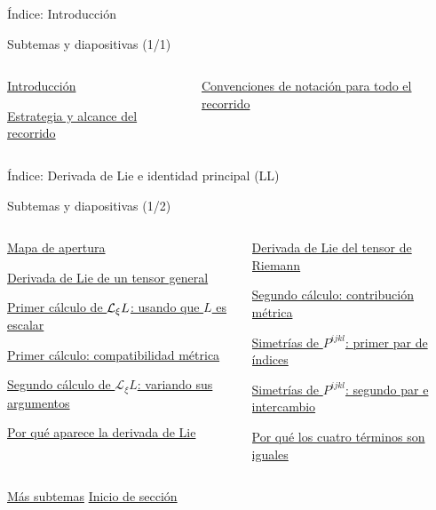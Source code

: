 \newcommand{\IndexEntry}[2]{%
\noindent\parbox[t]{.89\linewidth}{\raggedright\hyperlink{#1}{#2}}%
\hfill\parbox[t]{.08\linewidth}{\raggedleft\scriptsize\hyperlink{#1}{\pageref{#1}}}%
\par\medskip}

\begin{frame}[label=nav-index-0-1]{Índice: Introducción}
\footnotesize\raggedright
\textcolor{structure.fg}{Subtemas y diapositivas (1/1)}\par\medskip
\begin{columns}[T,onlytextwidth]
\begin{column}{.48\textwidth}
\IndexEntry{nav-frame-001}{Introducción}
\IndexEntry{nav-frame-002}{Estrategia y alcance del recorrido}
\end{column}
\begin{column}{.48\textwidth}
\IndexEntry{nav-notation}{Convenciones de notación para todo el recorrido}
\end{column}
\end{columns}
\vfill
\end{frame}

\begin{frame}[label=nav-index-1-1]{Índice: Derivada de Lie e identidad principal (LL)}
\footnotesize\raggedright
\textcolor{structure.fg}{Subtemas y diapositivas (1/2)}\par\medskip
\begin{columns}[T,onlytextwidth]
\begin{column}{.48\textwidth}
\IndexEntry{nav-map-1-0}{Mapa de apertura}
\IndexEntry{nav-frame-004}{Derivada de Lie de un tensor general}
\IndexEntry{nav-frame-005}{Primer cálculo de $\mathcal{L}_\xi L$: usando que $L$ es escalar}
\IndexEntry{nav-frame-006}{Primer cálculo: compatibilidad métrica}
\IndexEntry{nav-frame-007}{Segundo cálculo de $\mathcal L_\xi L$: variando sus argumentos}
\IndexEntry{nav-frame-008}{Por qué aparece la derivada de Lie}
\end{column}
\begin{column}{.48\textwidth}
\IndexEntry{nav-frame-009}{Derivada de Lie del tensor de Riemann}
\IndexEntry{nav-frame-010}{Segundo cálculo: contribución métrica}
\IndexEntry{nav-frame-011}{Simetrías de \(P^{ijkl}\): primer par de índices}
\IndexEntry{nav-frame-012}{Simetrías de \(P^{ijkl}\): segundo par e intercambio}
\IndexEntry{nav-frame-013}{Por qué los cuatro términos son iguales}
\end{column}
\end{columns}
\vfill
\hyperlink{nav-index-1-2}{\scriptsize Más subtemas}\qquad
\hyperlink{nav-map-1-0}{\scriptsize Inicio de sección}
\end{frame}

